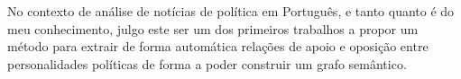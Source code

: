 \documentclass[a4paper, twocolumn, 11pt, twoside]{article}
\begin{document}

No contexto de análise de notícias de política em Português, e tanto quanto é do meu conhecimento, julgo este ser um dos primeiros trabalhos a propor um método para extrair de forma automática relações de apoio e oposição entre personalidades políticas de forma a poder construir um grafo semântico.





\end{document}
